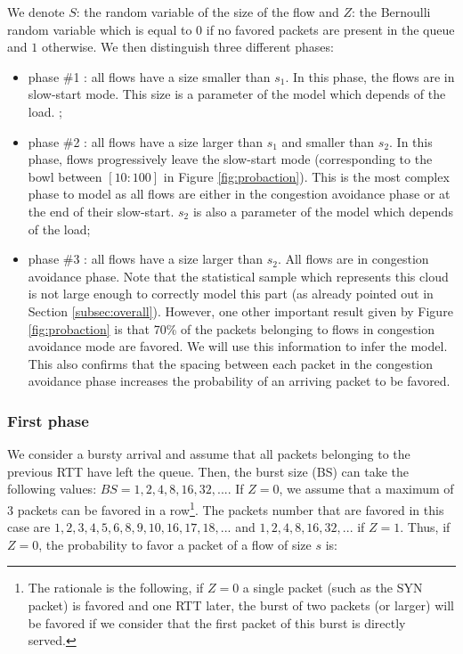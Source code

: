\documentclass{elsart}
\begin{document}
We denote $S$: the random variable of the size of the flow and $Z$: the Bernoulli random variable which is equal to $0$ if no favored packets are present in the queue and $1$ otherwise.
We then distinguish three different phases:
\begin{itemize}
	\item phase \#1 : all flows have a size smaller than $s_{1}$. In this phase, the flows are in slow-start mode. This size is a parameter of the model which depends of the load. ;
	\item phase \#2 : all flows have a size larger than $s_{1}$ and smaller than $s_{2}$.  In this phase, flows progressively leave the slow-start mode (corresponding to the  bowl between $[10:100]$ in Figure \ref{fig:probaction}). This is the most complex phase to model as all flows are either in the congestion avoidance phase or at the end of their slow-start. $s_{2}$ is also a parameter of the model which depends of the load;
	\item phase \#3 : all flows have a size larger than $s_{2}$. All flows are in congestion avoidance phase. Note that the statistical sample which represents this cloud is not large enough to correctly model this part (as already pointed out in Section \ref{subsec:overall}). However, one other important result given by Figure \ref{fig:probaction} is that 70\% of the packets belonging to flows in congestion avoidance mode are favored. We will use this information to infer the model. This also confirms that the spacing between each packet in the congestion avoidance phase increases the probability of an arriving packet to be favored. 
\end{itemize}

\subsubsection*{First phase}

We consider a bursty arrival and assume that all packets belonging to the previous RTT have left the queue. Then, the burst size (BS) can take the following values: $BS=1, 2, 4, 8, 16, 32, ...$. If $Z=0$, we assume that a maximum of 3 packets can be favored in a row\footnote{The rationale is the following, if $Z=0$ a single packet (such as the SYN packet) is favored and one RTT later, the burst of two packets (or larger) will be favored if we consider that the first packet of this burst is directly served.}. The packets number that are favored in this case are $1, 2, 3, 4, 5, 6, 8, 9, 10, 16, 17, 18, ...$ and  $1, 2, 4, 8, 16, 32, ...$ if $Z=1$. Thus, if $Z=0$, the probability to favor a packet of a flow of size $s$ is:
\end{document}
